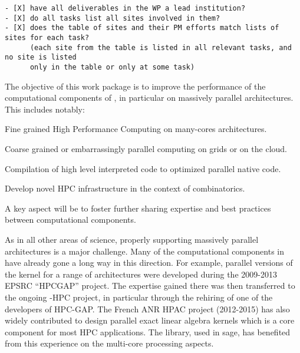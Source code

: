 \begin{draft}
\begin{verbatim}
- [X] have all deliverables in the WP a lead institution?
- [X] do all tasks list all sites involved in them? 
- [X] does the table of sites and their PM efforts match lists of sites for each task?
      (each site from the table is listed in all relevant tasks, and no site is listed
      only in the table or only at some task)
\end{verbatim}
\end{draft}



\begin{workpackage}[id=hpc,wphases=0-48,
  short=High Performance Math. Computing,%
  title=High Performance Mathematical Computing,
  lead=UJF,
  USHRM=12, %
  PSRM=6,   %
  LLRM=12,  %
  SARM=18, %
  UKRM=60, %
  UBRM=40,  %
  UJFRM=46] %
  

\begin{wpobjectives}
  The objective of this work package is to improve the performance of
  the computational components of \TheProject, in particular on
  massively parallel architectures. This includes notably:
  \begin{compactitem}
  \item Fine grained High Performance Computing on many-cores architectures.
  \item Coarse grained or embarrassingly parallel computing on grids or on the cloud.
  \item Compilation of high level interpreted code to optimized parallel native code.
  \item Develop novel HPC infrastructure in the context of combinatorics.
  \end{compactitem}
  A key aspect will be to foster further sharing expertise and best
  practices between computational components.
\end{wpobjectives}

\begin{wpdescription}
  As in all other areas of science, properly supporting massively
  parallel architectures is a major challenge. Many of the
  computational components in \TheProject have already gone a long way
  in this direction. For example, parallel versions
  of the \GAP kernel for
  a range of architectures were developed during the 2009-2013 EPSRC
  ``HPCGAP'' project. The expertise
  gained there was then transferred to the ongoing \Singular-HPC
  project, in particular through the rehiring of one of the developers
  of HPC-GAP. The French ANR HPAC project (2012-2015) has also widely contributed to design
  parallel exact linear algebra kernels  which is a core component for most HPC
  applications. The \Linbox library, used in sage, has benefited from this
  experience on the multi-core processing aspects. 


\end{wpdescription}
\end{workpackage}
